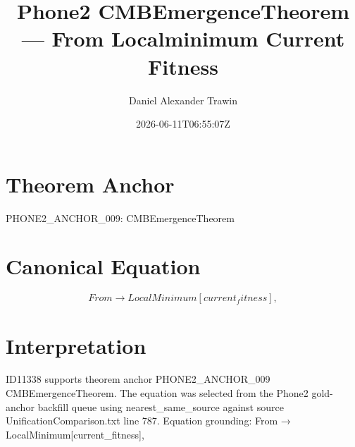 \documentclass[11pt]{article}
\title{Phone2 CMBEmergenceTheorem — From Localminimum Current Fitness}
\author{Daniel Alexander Trawin}
\date{2026-06-11T06:55:07Z}
\begin{document}
\maketitle
\section*{Theorem Anchor}
PHONE2_ANCHOR_009: CMBEmergenceTheorem
\section*{Canonical Equation}
\[
From → LocalMinimum[current_fitness],
\]
\section*{Interpretation}
ID11338 supports theorem anchor PHONE2_ANCHOR_009 CMBEmergenceTheorem. The equation was selected from the Phone2 gold-anchor backfill queue using nearest_same_source against source UnificationComparison.txt line 787. Equation grounding: From → LocalMinimum[current_fitness],
\end{document}
